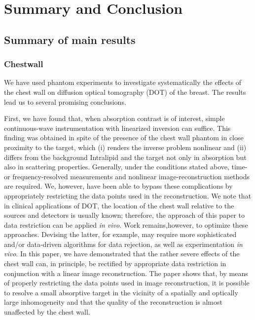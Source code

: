 \chapter{Summary and Conclusion}

\section{Summary of main results}


\subsection{Chestwall}

We have used phantom experiments to investigate systematically the
effects of the chest wall on diffusion optical tomography (DOT) of the
breast.  The results lead us to several promising conclusions.

First, we have found that, when absorption contrast is of interest,
simple continuous-wave instrumentation with linearized inversion can
suffice. This finding was obtained in spite of the presence of the
chest wall phantom in close proximity to the target, which (i) renders
the inverse problem nonlinear and (ii) differs from the background
Intralipid and the target not only in absorption but also in
scattering properties.  Generally, under the conditions stated above,
time- or frequency-resolved measurements and nonlinear
image-reconstruction methods are required. We, however, have been able
to bypass these complications by appropriately restricting the data
points used in the reconstruction. We note that in
  clinical applications of DOT, the location of the chest wall
  relative to the sources and detectors is usually known;
  therefore, the approach of this paper to data restriction can
  be applied {\em in vivo}. Work remains,however, to optimize these approaches. Devising the latter, for example, may require more sophisticated
  and/or data-driven algorithms for data rejection, as well as
  experimentation {\em in vivo}. In this paper, we have demonstrated that
  the rather severe effects of the chest wall can, in principle, be
  rectified by appropriate data restriction in conjunction with a
  linear image reconstruction. The paper shows that, by means of properly restricting the data points used in image
reconstruction, it is possible to resolve a small absorptive target in
the vicinity of a spatially and optically large inhomogeneity
and that the quality of the reconstruction is almost
  unaffected by the chest wall.

